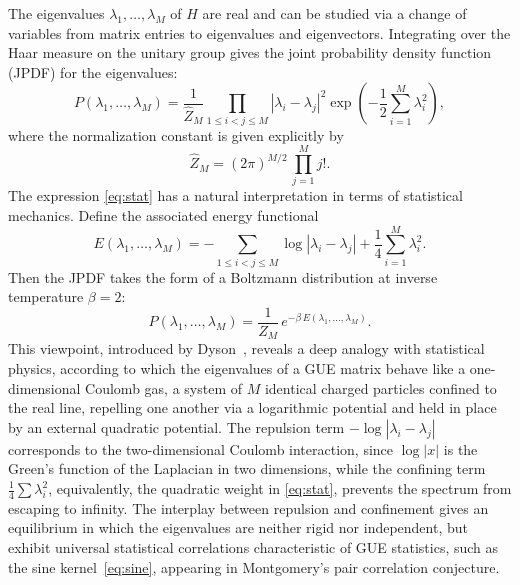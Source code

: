 \documentclass[12pt,reqno]{amsart}
\theoremstyle{plain}
\theoremstyle{definition}
\theoremstyle{remark}
\begin{document}
The eigenvalues \( \lambda_1, \dots, \lambda_M \) of \( H \) are real and can be studied via a change of variables from matrix entries to eigenvalues and eigenvectors. Integrating over the Haar measure on the unitary group gives the joint probability density function (JPDF) for the eigenvalues:
\begin{equation}
\label{eq:stat}
P(\lambda_1, \dots, \lambda_M)
= \frac{1}{\hat{Z}_M}
  \prod_{1 \le i < j \le M} |\lambda_i - \lambda_j|^{2}
  \exp\!\left(-\frac{1}{2}\sum_{i=1}^M \lambda_i^{2}\right),
\end{equation}
where the normalization constant is given explicitly by
\begin{equation}
\hat{Z}_M
= (2\pi)^{M/2}\,\prod_{j=1}^M j! .
\end{equation}
The expression \eqref{eq:stat} has a natural interpretation in terms of statistical mechanics. Define the associated energy functional
\begin{equation}
\label{eq:CoulombEnergy}
E(\lambda_1, \dots, \lambda_M)
= - \sum_{1 \le i < j \le M} \log |\lambda_i - \lambda_j|
  + \frac{1}{4}\sum_{i=1}^M \lambda_i^2 .
\end{equation}
Then the JPDF takes the form of a Boltzmann distribution at inverse temperature \( \beta = 2 \):
\begin{equation}
P(\lambda_1, \dots, \lambda_M) = \frac{1}{Z_M}\, e^{-\beta\, E(\lambda_1, \dots, \lambda_M)}.
\end{equation}
This viewpoint, introduced by Dyson~\cite{Dyson}, reveals a deep analogy with statistical physics, according to which the eigenvalues of a GUE matrix behave like a one-dimensional Coulomb gas, a system of $M$ identical charged particles confined to the real line, repelling one another via a logarithmic potential and held in place by an external quadratic potential. The repulsion term \( -\log|\lambda_i - \lambda_j| \) corresponds to the two-dimensional Coulomb interaction, since \( \log|x| \) is the Green's function of the Laplacian in two dimensions, while the confining term \( \tfrac{1}{4}\sum \lambda_i^2 \), equivalently, the quadratic weight in \eqref{eq:stat}, prevents the spectrum from escaping to infinity. The interplay between repulsion and confinement gives an equilibrium in which the eigenvalues are neither rigid nor independent, but exhibit universal statistical correlations characteristic of GUE statistics, such as the sine kernel~\eqref{eq:sine}, appearing in Montgomery’s pair correlation conjecture.
\end{document}
